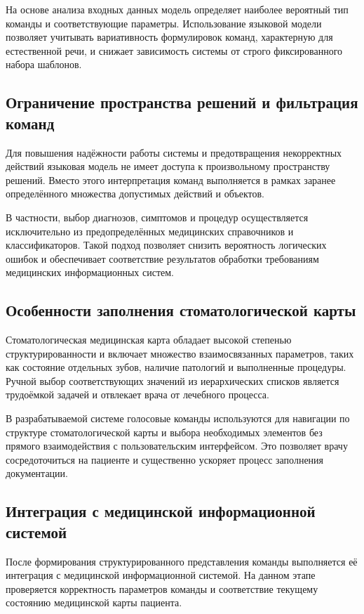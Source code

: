 На основе анализа входных данных модель определяет наиболее вероятный тип команды и соответствующие параметры. Использование языковой модели позволяет учитывать вариативность формулировок команд, характерную для естественной речи, и снижает зависимость системы от строго фиксированного набора шаблонов.

\subsection{Ограничение пространства решений и фильтрация команд}

Для повышения надёжности работы системы и предотвращения некорректных действий языковая модель не имеет доступа к произвольному пространству решений. Вместо этого интерпретация команд выполняется в рамках заранее определённого множества допустимых действий и объектов.

В частности, выбор диагнозов, симптомов и процедур осуществляется исключительно из предопределённых медицинских справочников и классификаторов. Такой подход позволяет снизить вероятность логических ошибок и обеспечивает соответствие результатов обработки требованиям медицинских информационных систем.

\subsection{Особенности заполнения стоматологической карты}

Стоматологическая медицинская карта обладает высокой степенью структурированности и включает множество взаимосвязанных параметров, таких как состояние отдельных зубов, наличие патологий и выполненные процедуры. Ручной выбор соответствующих значений из иерархических списков является трудоёмкой задачей и отвлекает врача от лечебного процесса.

В разрабатываемой системе голосовые команды используются для навигации по структуре стоматологической карты и выбора необходимых элементов без прямого взаимодействия с пользовательским интерфейсом. Это позволяет врачу сосредоточиться на пациенте и существенно ускоряет процесс заполнения документации.

\subsection{Интеграция с медицинской информационной системой}

После формирования структурированного представления команды выполняется её интеграция с медицинской информационной системой. На данном этапе проверяется корректность параметров команды и соответствие текущему состоянию медицинской карты пациента.

